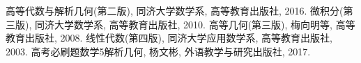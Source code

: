 \begin{thebibliography}{99}
    高等代数与解析几何(第二版),
    同济大学数学系,
    高等教育出版社,
    2016.
    微积分(第三版),
    同济大学数学系,
    高等教育出版社,
    2010.
    高等几何(第三版),
    梅向明等,
    高等教育出版社,
    2008.
    线性代数(第四版),
    同济大学应用数学系,
    高等教育出版社,
    2003.
    高考必刷题数学5解析几何,
    杨文彬,
    外语教学与研究出版社,
    2017.
\end{thebibliography}
